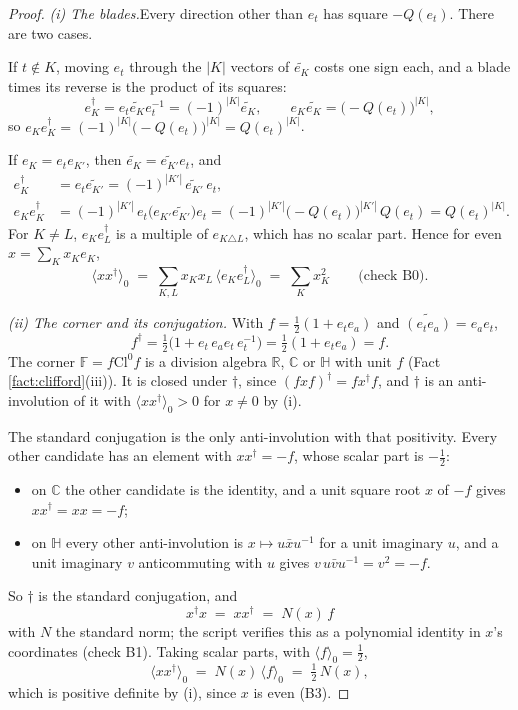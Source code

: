 \documentclass[11pt]{article}
\theoremstyle{definition}
\newcommand{\Cl}{\mathrm{Cl}}
\newcommand{\R}{\mathbb{R}}
\newcommand{\C}{\mathbb{C}}
\newcommand{\HH}{\mathbb{H}}
\newcommand{\F}{\mathbb{F}}
\newcommand{\rev}[1]{\widetilde{#1}}
\newcommand{\ip}[1]{\langle #1 \rangle}
\newcommand{\pstep}[1]{\par\smallskip\noindent\textit{#1.}\enspace}
\begin{document}
\begin{proof}
\textit{(i) The blades.}\enspace Every direction other than $e_{t}$ has square $-Q(e_{t})$. There are two cases.

If $t \notin K$, moving $e_{t}$ through the $|K|$ vectors of $\rev{e_{K}}$ costs one sign each, and a blade times its reverse is the product of its squares:
\[
e_{K}^{\dagger} = e_{t}\rev{e_{K}}e_{t}^{-1} = (-1)^{|K|}\rev{e_{K}}, \qquad e_{K}\rev{e_{K}} = \bigl(-Q(e_{t})\bigr)^{|K|},
\]
so $e_{K}e_{K}^{\dagger} = (-1)^{|K|}\bigl(-Q(e_{t})\bigr)^{|K|} = Q(e_{t})^{|K|}$.

If $e_{K} = e_{t}e_{K'}$, then $\rev{e_{K}} = \rev{e_{K'}}e_{t}$, and
\begin{align*}
e_{K}^{\dagger} &= e_{t}\rev{e_{K'}} = (-1)^{|K'|}\,\rev{e_{K'}}\,e_{t}, \\
e_{K}e_{K}^{\dagger} &= (-1)^{|K'|}\,e_{t}\bigl(e_{K'}\rev{e_{K'}}\bigr)e_{t} = (-1)^{|K'|}\bigl(-Q(e_{t})\bigr)^{|K'|}\,Q(e_{t}) = Q(e_{t})^{|K|}.
\end{align*}
For $K \neq L$, $e_{K}e_{L}^{\dagger}$ is a multiple of $e_{K \triangle L}$, which has no scalar part. Hence for even $x = \sum_{K}x_{K}e_{K}$,
\[
\ip{xx^{\dagger}}_{0} \;=\; \sum_{K,L}x_{K}x_{L}\,\ip{e_{K}e_{L}^{\dagger}}_{0} \;=\; \sum_{K}x_{K}^{2} \qquad \text{(check B0)}.
\]

\pstep{(ii) The corner and its conjugation} With $f = \tfrac{1}{2}(1 + e_{t}e_{a})$ and $\rev{(e_{t}e_{a})} = e_{a}e_{t}$,
\[
f^{\dagger} = \tfrac{1}{2}\bigl(1 + e_{t}\,e_{a}e_{t}\,e_{t}^{-1}\bigr) = \tfrac{1}{2}(1 + e_{t}e_{a}) = f.
\]
The corner $\F = f\Cl^{0}f$ is a division algebra $\R$, $\C$ or $\HH$ with unit $f$ (Fact \ref{fact:clifford}(iii)). It is closed under $\dagger$, since $(fxf)^{\dagger} = fx^{\dagger}f$, and $\dagger$ is an anti-involution of it with $\ip{xx^{\dagger}}_{0} > 0$ for $x \neq 0$ by (i).

The standard conjugation is the only anti-involution with that positivity. Every other candidate has an element with $xx^{\dagger} = -f$, whose scalar part is $-\tfrac{1}{2}$:
\begin{itemize}
\item on $\C$ the other candidate is the identity, and a unit square root $x$ of $-f$ gives $xx^{\dagger} = xx = -f$;
\item on $\HH$ every other anti-involution is $x \mapsto u\bar{x}u^{-1}$ for a unit imaginary $u$, and a unit imaginary $v$ anticommuting with $u$ gives $v\,u\bar{v}u^{-1} = v^{2} = -f$.
\end{itemize}
So $\dagger$ is the standard conjugation, and
\[
x^{\dagger}x \;=\; xx^{\dagger} \;=\; N(x)\,f
\]
with $N$ the standard norm; the script verifies this as a polynomial identity in $x$'s coordinates (check B1). Taking scalar parts, with $\ip{f}_{0} = \tfrac{1}{2}$,
\[
\ip{xx^{\dagger}}_{0} \;=\; N(x)\,\ip{f}_{0} \;=\; \tfrac{1}{2}\,N(x),
\]
which is positive definite by (i), since $x$ is even (B3).


\end{proof}
\end{document}
